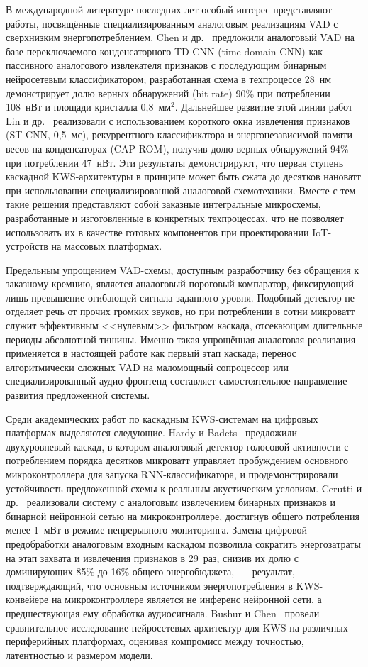 В международной литературе последних лет особый интерес представляют
работы, посвящённые специализированным аналоговым реализациям VAD с
сверхнизким энергопотреблением. Chen и др.~\cite{src:29} предложили
аналоговый VAD на базе переключаемого конденсаторного TD-CNN
(time-domain CNN) как пассивного аналогового извлекателя признаков с
последующим бинарным нейросетевым классификатором; разработанная схема
в техпроцессе 28~нм демонстрирует долю верных обнаружений (hit rate)
90\% при потреблении 108~нВт и площади кристалла 0,8~мм$^2$. Дальнейшее
развитие этой линии работ Lin и др.~\cite{src:30} реализовали с
использованием короткого окна извлечения признаков (ST-CNN, 0,5~мс),
рекуррентного классификатора и энергонезависимой памяти весов на
конденсаторах (CAP-ROM), получив долю верных обнаружений 94\% при
потреблении 47~нВт. Эти результаты демонстрируют, что первая ступень
каскадной KWS-архитектуры в принципе может быть сжата до десятков
нановатт при использовании специализированной аналоговой схемотехники.
Вместе с тем такие решения представляют собой заказные интегральные
микросхемы, разработанные и изготовленные в конкретных техпроцессах,
что не позволяет использовать их в качестве готовых компонентов при
проектировании IoT-устройств на массовых платформах.

Предельным упрощением VAD-схемы, доступным разработчику без обращения к
заказному кремнию, является аналоговый пороговый компаратор, фиксирующий
лишь превышение огибающей сигнала заданного уровня. Подобный детектор не
отделяет речь от прочих громких звуков, но при потреблении в сотни
микроватт служит эффективным <<нулевым>> фильтром каскада, отсекающим
длительные периоды абсолютной тишины. Именно такая упрощённая аналоговая
реализация применяется в настоящей работе как первый этап каскада;
перенос алгоритмически сложных VAD на маломощный сопроцессор или
специализированный аудио-фронтенд составляет самостоятельное направление
развития предложенной системы.

Среди академических работ по каскадным KWS-системам на цифровых
платформах выделяются следующие. Hardy и Badets~\cite{src:6} предложили
двухуровневый каскад, в котором аналоговый детектор голосовой активности
с потреблением порядка десятков микроватт управляет пробуждением
основного микроконтроллера для запуска RNN-классификатора, и
продемонстрировали устойчивость предложенной схемы к реальным
акустическим условиям. Cerutti и др.~\cite{src:7} реализовали систему с
аналоговым извлечением бинарных признаков и бинарной нейронной сетью на
микроконтроллере, достигнув общего потребления менее 1~мВт в режиме
непрерывного мониторинга. Замена цифровой предобработки аналоговым
входным каскадом позволила сократить энергозатраты на этап захвата и
извлечения признаков в 29~раз, снизив их долю с доминирующих 85\% до
16\% общего энергобюджета,~--- результат, подтверждающий, что основным
источником энергопотребления в KWS-конвейере на микроконтроллере
является не инференс нейронной сети, а предшествующая ему обработка
аудиосигнала. Bushur и Chen~\cite{src:8} провели сравнительное
исследование нейросетевых архитектур для KWS на различных периферийных
платформах, оценивая компромисс между точностью, латентностью и размером
модели.

